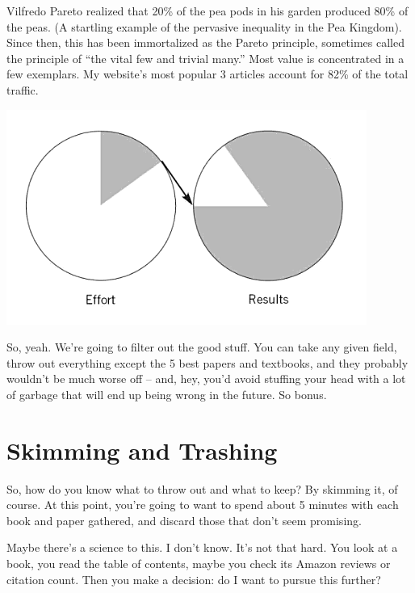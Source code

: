 Vilfredo Pareto realized that 20\% of the pea pods in his garden produced 80\% of the peas. (A startling example of the pervasive inequality in the Pea Kingdom). Since then, this has been immortalized as the Pareto principle, sometimes called the principle of ``the vital few and trivial many.'' Most value is concentrated in a few exemplars. My website's most popular 3 articles account for 82\% of the total traffic.

\includegraphics[width=\textwidth]{graphics/pareto-principle}

So, yeah. We're going to filter out the good stuff. You can take any given
field, throw out everything except the 5 best papers and textbooks, and they
probably wouldn't be much worse off -- and, hey, you'd avoid stuffing your head
with a lot of garbage that will end up being wrong in the future. So bonus.

\section{Skimming and Trashing}

So, how do you know what to throw out and what to keep? By skimming it, of
course. At this point, you're going to want to spend about 5 minutes with each
book and paper gathered, and discard those that don't seem promising.

Maybe there's a science to this. I don't know. It's not that hard. You look at a
book, you read the table of contents, maybe you check its Amazon reviews or
citation count. Then you make a decision: do I want to pursue this further?


